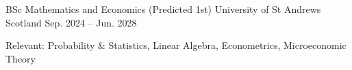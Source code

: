 

\begin{cventries}

  \cventry
    {BSc Mathematics and Economics (Predicted 1st)} %
    {University of St Andrews} %
    {Scotland} %
    {Sep. 2024 -- Jun. 2028} %
    {
      \begin{cvitems}
        \item {Relevant: Probability \& Statistics, Linear Algebra, Econometrics, Microeconomic Theory}
      \end{cvitems}
    }

\end{cventries}
